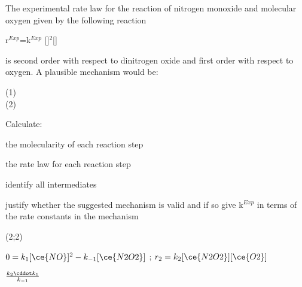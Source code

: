 \documentclass[main.tex]{subfiles}
\begin{document}
\begin{multicols*}{2}
\begin{question}[ID=\the\value{numA}]
The experimental rate law for the reaction of nitrogen monoxide and molecular oxygen given by the following reaction
  \begin{center}	\hfill r$^{Exp}$=k$^{Exp}$ []$^2$[]\end{center}
is second order with respect to dinitrogen oxide and first order with respect to oxygen. A plausible mechanism would be:
  \begin{center}(1)\hfill{} \\
(2)\hfill{} 
\end{center}
Calculate: 
\begin{inparaenum}[(a)]	
\item  the molecularity of each reaction step %
\item  the rate law for each reaction step %
\item identify all intermediates %
\item justify whether the suggested mechanism is valid and if so give k$^{Exp}$ in terms of the rate constants in the mechanism %
 \end{inparaenum}
\end{question}
\begin{solution}
\begin{inparaenum}[(a)]
\item   (2;2)
\item   $0=k_1[\ce{NO}]^2-k_{-1}[\ce{N2O2}]$ ; $r_2=k_2[\ce{N2O2}][\ce{O2}]$		 
\item  {} 
\item  $\frac{k_2\cddot k_1}{k_{-1}}$
 \end{inparaenum}
\hspace{0.1cm}\end{solution}%





\end{multicols*}
\end{document}
